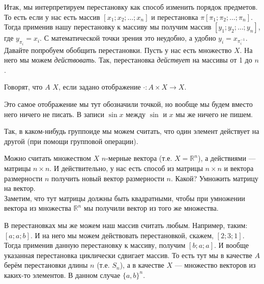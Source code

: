 \documentclass{article}
\begin{document}
\begin{itemize}
\begin{Comment}
        \end{Comment}
        \begin{Comment}
            Итак, мы интерпретируем перестановку как способ изменить порядок предметов. То есть если у нас есть массив $[x_1;x_2;\ldots;x_n]$ и перестановка $\pi[\pi_1;\pi_2;\ldots;\pi_n]$. Тогда применив нашу перестановку к массиву мы получим массив $[y_1;y_2;\ldots;y_n]$, где $y_{\pi_i}=x_i$. С математической точки зрения это неудобно, а удобно $y_i=x_{\pi^{-1}_i}$.\\
            Давайте попробуем обобщить перестановки. Пусть у нас есть множество $X$. На него мы можем \textit{действовать}. Так, перестановка \textit{действует} на массивы от 1 до $n$.
        \end{Comment}
        \dfn Говорят, что $A$  $X$, если задано отображение $\cdot\colon A\times X\to X$.
        \begin{Comment}
            Это самое отображение мы тут обозначили точкой, но вообще мы будем вместо него ничего не писать. В записи $\sin x$ между $\sin$ и $x$ мы же ничего не пишем.
        \end{Comment}
        \begin{Example}
            Так, в каком-нибудь группоиде мы можем считать, что один элемент действует на другой (при помощи групповой операции).
        \end{Example}
        \begin{Example}
            Можно считать множеством $X$ $n$-мерные вектора (т.е. $X=\mathbb R^n$), а действиями --- матрицы $n\times n$. И действительно, у нас есть способ из матрицы $n\times n$ и вектора размерности $n$ получить новый вектор размерности $n$. Какой? Умножить матрицу на вектор.\\
            Заметим, что тут матрицы должны быть квадратными, чтобы при умножении вектора из множества $\mathbb R^n$ мы получили вектор из того же множества.
        \end{Example}
        \begin{Example}
            В перестановках мы же можем наш массив считать любым. Например, таким: $[a;a;b]$. И на него мы можем действовать перестановкой, скажем, $[2;3;1]$. Тогда применив данную перестановку к массиву, получим $[b;a;a]$. И вообще указанная перестановка циклически сдвигает массив. То есть тут мы в качестве $A$ берём перестановки длины $n$ (т.е. $S_n$), а в качестве $X$ --- множество векторов из каких-то элементов. В данном случае $\{a,b\}^n$.
        \end{Example}

\end{itemize}
\end{document}
